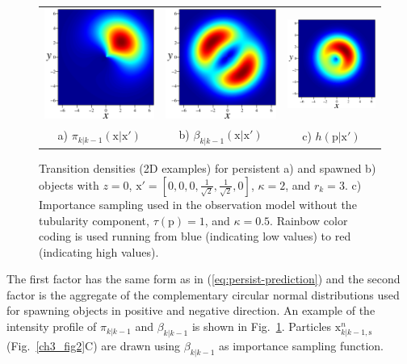\begin{figure}
	\centering
	\begin{tabular}{c@{\hspace{1em}}c@{\hspace{1em}}c}
		\includegraphics[height=0.3\columnwidth]{fig3a_embedded} &
		\includegraphics[height=0.3\columnwidth]{fig3b_embedded} &
		\includegraphics[height=0.3\columnwidth]{fig3c_embedded} \\
		a) $\pi_{k|k-1}(\mathrm{x}|\mathrm{x'})$ & b) $\beta_{k|k-1}(\mathrm{x}|\mathrm{x'})$ & c) $h(\mathrm{p}|\mathrm{x'})$ \\
	\end{tabular}  		
	\caption{Transition densities (2D examples) for persistent a) and spawned b) objects with $z=0$, $\mathrm{x'}=\left[ 0,0,0, \tfrac{1}{\sqrt{2}},\tfrac{1}{\sqrt{2}}, 0 \right] $, $\kappa=2$, and $r_k=3$. c) Importance sampling used in the observation model without the tubularity component, $\tau(\mathrm{p})=1$, and $\kappa=0.5$. Rainbow color coding is used running from blue (indicating low values) to red (indicating high values).}
	\label{ch3_fig3}
\end{figure}
The first factor has the same form as in (\ref{eq:persist-prediction}) and the second factor is the aggregate of the complementary circular normal distributions used for spawning objects in positive and negative direction. An example of the intensity profile of $\pi_{k|k-1}$ and $\beta_{k|k-1}$ is shown in Fig.~\ref{ch3_fig3}. Particles $\mathrm{x}_{k|k-1,\mathrm{s}}^{n}$ (Fig.~\ref{ch3_fig2}C) are drawn using $\beta_{k|k-1}$ as importance sampling function.

